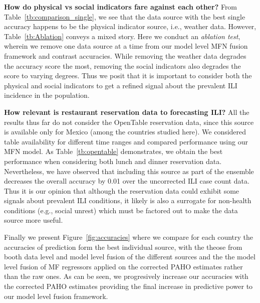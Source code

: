 {\noindent \textbf{How do physical vs social indicators fare against each other?}} 
From Table~\ref{tb:comparison_single}, we 
see that the data source with the best single accuracy happens to be the physical indicator source, i.e.,
weather data. However, Table~\ref{tb:Ablation} conveys a mixed story. Here we conduct an {\it ablation test},
wherein we remove one data source at a time from our model level MFN fusion framework and contrast accuracies.
While removing the weather data degrades the accuracy score the most, removing the social indicators also degrades
the score to varying degrees.
Thus we posit that it is important to consider both the physical 
and social indicators to get a refined signal about the prevalent ILI incidence in the population.



{\noindent \textbf{How relevant is restaurant reservation data to forecasting ILI?}} 
All the results thus far do not consider the OpenTable reservation data, since this source is available only for
Mexico (among the countries studied here). We considered table availability for different time ranges and compared
performance using our MFN model. As Table~\ref{tb:opentable} demonstrates, we obtain the best performance when
considering both lunch and dinner reservation data. Nevertheless, we have observed that including this source
as part of the ensemble decreases the overall accuracy by 0.01 over the uncorrected ILI case count data.
Thus it is our opinion that although the reservation data could exhibit some signals about prevalent ILI
conditions, it likely is also a surrogate for non-health conditions (e.g., social unrest) which must be factored
out to make the data source more useful.

Finally we present Figure~\ref{fig:accuracies} where we compare
for each country the accuracies of prediction form the best individual source, with the theose from
booth data level and model level fusion of the different sources and the  
the model level fusion of MF regressors applied on the corrected PAHO 
estimates rather than the raw ones. As can be seen, we progresively increase our accuracies
with the corrected PAHO estimates providing the final increase in predictive power to 
our model level fusion framework.


